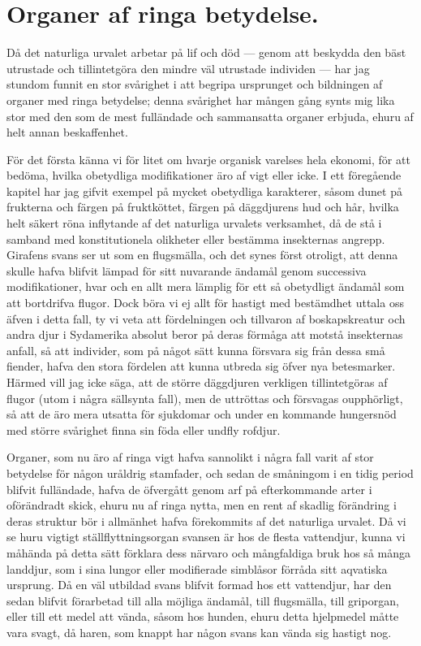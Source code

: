 \section{Organer af ringa betydelse.}

Då det naturliga urvalet arbetar på lif och död — genom att beskydda den bäst utrustade och tillintetgöra den mindre väl utrustade individen — har jag stundom funnit en stor svårighet i att begripa ursprunget och bildningen af organer med ringa betydelse; denna svårighet har mången gång synts mig lika stor med den som de mest fulländade och sammansatta organer erbjuda, ehuru af helt annan beskaffenhet.

För det första känna vi för litet om hvarje organisk varelses hela ekonomi, för att bedöma, hvilka obetydliga modifikationer äro af vigt eller icke. I ett föregående kapitel har jag gifvit exempel på mycket obetydliga karakterer, såsom dunet på frukterna och färgen på fruktköttet, färgen på däggdjurens hud och hår, hvilka helt säkert röna inflytande af det naturliga urvalets verksamhet, då de stå i samband med konstitutionela olikheter eller bestämma insekternas angrepp. Girafens svans ser ut som en flugsmälla, och det synes först otroligt, att denna skulle hafva blifvit lämpad för sitt nuvarande ändamål genom successiva modifikationer, hvar och en allt mera lämplig för ett så obetydligt ändamål som att bortdrifva flugor. Dock böra vi ej allt för hastigt med bestämdhet uttala oss äfven i detta fall, ty vi veta att fördelningen och tillvaron af boskapskreatur och andra djur i Sydamerika absolut beror på deras förmåga att motstå insekternas anfall, så att individer, som på något sätt kunna försvara sig från dessa små fiender, hafva den stora fördelen att kunna utbreda sig öfver nya betesmarker. Härmed vill jag icke säga, att de större däggdjuren verkligen tillintetgöras af flugor (utom i några sällsynta fall), men de uttröttas och försvagas oupphörligt, så att de äro mera utsatta för sjukdomar och under en kommande hungersnöd med större svårighet finna sin föda eller undfly rofdjur.

Organer, som nu äro af ringa vigt hafva sannolikt i några fall varit af stor betydelse för någon uråldrig stamfader, och sedan de småningom i en tidig period blifvit fulländade, hafva de öfvergått genom arf på efterkommande arter i oförändradt skick, ehuru nu af ringa nytta, men en rent af skadlig förändring i deras struktur bör i allmänhet hafva förekommits af det naturliga urvalet. Då vi se huru vigtigt ställflyttningsorgan svansen är hos de flesta vattendjur, kunna vi måhända på detta sätt förklara dess närvaro och mångfaldiga bruk hos så många landdjur, som i sina lungor eller modifierade simblåsor förråda sitt aqvatiska ursprung. Då en väl utbildad svans blifvit formad hos ett vattendjur, har den sedan blifvit förarbetad till alla möjliga ändamål, till flugsmälla, till griporgan, eller till ett medel att vända, såsom hos hunden, ehuru detta hjelpmedel måtte vara svagt, då haren, som knappt har någon svans kan vända sig hastigt nog.

